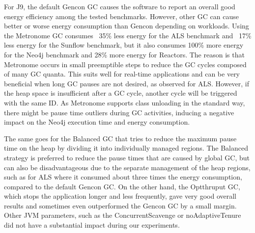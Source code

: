 For \textsc{J9}, the default \textsf{Gencon} GC causes the software to report an overall good energy efficiency among the tested benchmarks.
However, other GC can cause better or worse energy consumption than \textsf{Gencon} depending on workloads.
Using the \textsf{Metronome} GC consumes ~35\% less energy for the \textsf{ALS} benchmark and ~17\% less energy for the \textsf{Sunflow} benchmark, but it also consumes 100\% more energy for the \textsf{Neo4j} benchmark and 28\% more energy for \textsf{Reactors}.
The reason is that \textsf{Metronome} occurs in small preemptible steps to reduce the GC cycles composed of many GC quanta.
This suits well for real-time applications and can be very beneficial when long GC pauses are not desired, as observed for \textsf{ALS}.
However, if the heap space is insufficient after a GC cycle, another cycle will be triggered with the same ID.
As \textsf{Metronome} supports class unloading in the standard way, there might be pause time outliers during GC activities, inducing a negative impact on the \textsf{Neo4j} execution time and energy consumption.

The same goes for the \textsf{Balanced} GC that tries to reduce the maximum pause time on the heap by dividing it into individually managed regions.
The \textsf{Balanced} strategy is preferred to reduce the pause times that are caused by global GC, but can also be disadvantageous due to the separate management of the heap regions, such as for \textsf{ALS} where it consumed about three times the energy consumption, compared to the default \textsf{Gencon} GC.
On the other hand, the \textsf{Optthruput} GC, which stops the application longer and less frequently, gave very good overall results and sometimes even outperformed the \textsf{Gencon} GC by a small margin.
Other JVM parameters, such as the \textsf{ConcurrentScavenge} or \textsf{noAdaptiveTenure} did not have a substantial impact during our experiments.

